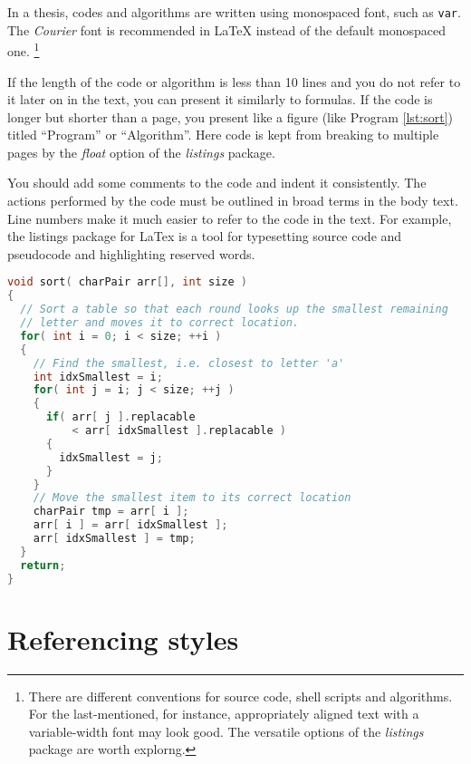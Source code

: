 \documentclass[twoside,draftfooter]{tutthesis} %
\begin{document}
In a thesis, codes and algorithms are written using monospaced font, such as \texttt{var}.
The \emph{Courier} font is recommended in LaTeX instead of the default monospaced one.
\footnote{There are different conventions for source code, shell scripts and algorithms.
  For the last-mentioned, for instance, appropriately aligned text with a variable-width font may look good.
  The versatile options of the \emph{listings} package are worth explorng.}

If the length of the code or algorithm is less than 10 lines and you do not refer to it later on in the text, you can present it similarly to formulas.
If the code is longer but shorter than a page, you present like a figure (like Program \ref{lst:sort}) titled ``Program'' or ``Algorithm''.
Here code is kept from breaking to multiple pages by the \emph{float} option of the \emph{listings} package.

You should add some comments to the code and indent it consistently.
The actions performed by the code must be outlined in broad terms in the body text.
Line numbers make it much easier to refer to the code in the text.
For example, the listings package for LaTex \citep{Heinz2006, Oetiker2011} is a tool for typesetting source code and pseudocode and highlighting reserved words.

\iftrue %
\begin{lstlisting}[float,caption={Example of presenting program code as a figure in a thesis.},label={lst:sort},language=C]
void sort( charPair arr[], int size )
{
  // Sort a table so that each round looks up the smallest remaining
  // letter and moves it to correct location.
  for( int i = 0; i < size; ++i )
  {
    // Find the smallest, i.e. closest to letter 'a'
    int idxSmallest = i;
    for( int j = i; j < size; ++j )
    {
      if( arr[ j ].replacable
          < arr[ idxSmallest ].replacable )
      {
        idxSmallest = j;
      }
    }
    // Move the smallest item to its correct location
    charPair tmp = arr[ i ];
    arr[ i ] = arr[ idxSmallest ];
    arr[ idxSmallest ] = tmp;
  }
  return;
}
\end{lstlisting}
\else
\label{lst:sort}
Code example commented out in this version. Load the \texttt{listings} package if you are using code listings.
\fi




\chapter{Referencing styles}
\label{ch:referencingstyles}
\end{document}
